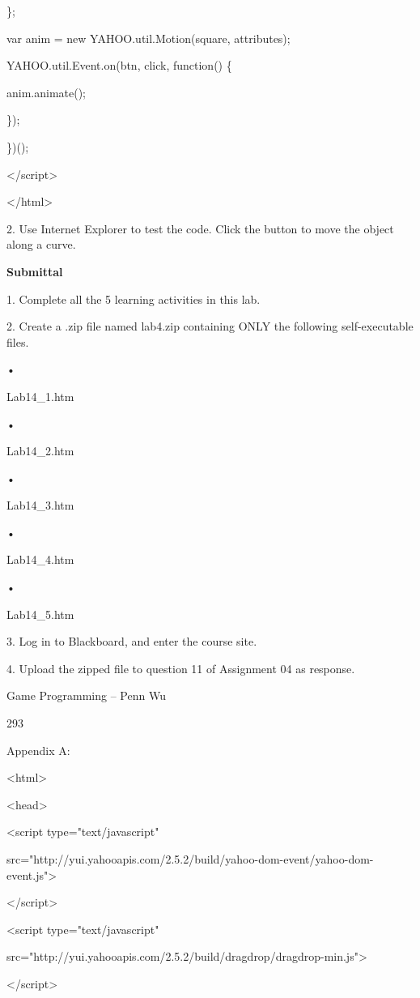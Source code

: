\documentclass[
]{article}
\begin{document}
\};

var anim = new
YAHOO.util.Motion(\textquotesingle square\textquotesingle, attributes);

YAHOO.util.Event.on(\textquotesingle btn\textquotesingle,
\textquotesingle click\textquotesingle, function() \{

anim.animate();

\});

\})();

\textless/script\textgreater{}

\textless/html\textgreater{}

2. Use Internet Explorer to test the code. Click the button to move the
object along a curve.

\textbf{Submittal}

1. Complete all the 5 learning activities in this lab.

2. Create a .zip file named lab4.zip containing ONLY the following
self-executable files.

•

Lab14\_1.htm

•

Lab14\_2.htm

•

Lab14\_3.htm

•

Lab14\_4.htm

•

Lab14\_5.htm

3. Log in to Blackboard, and enter the course site.

4. Upload the zipped file to question 11 of Assignment 04 as response.

Game Programming -- Penn Wu

293

\protect\hypertarget{index_split_015.htmlux5cux23p294}{}{}Appendix A:

\textless html\textgreater{}

\textless head\textgreater{}

\textless script type="text/javascript"

src="http://yui.yahooapis.com/2.5.2/build/yahoo-dom-event/yahoo-dom-event.js"\textgreater{}

\textless/script\textgreater{}

\textless script type="text/javascript"

src="http://yui.yahooapis.com/2.5.2/build/dragdrop/dragdrop-min.js"\textgreater{}

\textless/script\textgreater{}
\end{document}

